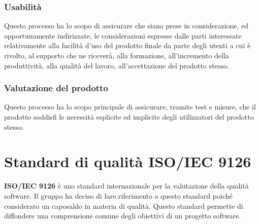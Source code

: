 \subsubsection{Usabilità}

Questo processo ha lo scopo di assicurare che siano prese in considerazione, ed opportunamente indirizzate, le considerazioni espresse dalle parti interessate relativamente alla facilità d'uso del prodotto finale da parte degli utenti a cui è rivolto, al supporto che ne riceverà, alla formazione, all'incremento della produttività, alla qualità del lavoro, all'accettazione del prodotto stesso.


\subsubsection{Valutazione del prodotto}

Questo processo ha lo scopo principale di assicurare, tramite test e misure, che il prodotto soddisfi le necessità esplicite ed implicite degli utilizzatori del prodotto stesso.

\section{Standard di qualità ISO/IEC 9126}

\textbf{ISO/IEC 9126} è uno standard internazionale per la valutazione della qualità software.
Il gruppo \groupName{} ha deciso di fare riferimento a questo standard poiché considerato un caposaldo in materia di qualità.
Questo standard permette di diffondere una comprensione comune degli obiettivi di un progetto software.

